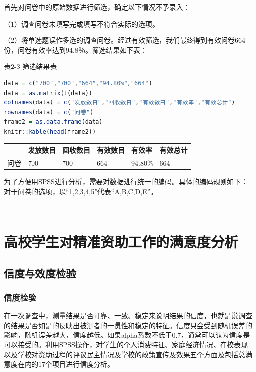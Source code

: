 \documentclass[UTF8,a4paper,12pt]{ctexart}  %
\begin{document}
首先对问卷中的原始数据进行筛选，确定以下情况不予录入：

（1）调查问卷未填写完或填写不符合实际的选项。

（2）将单选题误作多选的调查问卷。经过有效筛选，我们最终得到有效问卷664份，问卷有效率达到94.8％。筛选结果如下表：

表2-3 筛选结果表

\begin{lstlisting}[language=R]
data = c("700","700","664","94.80%","664")
data = as.matrix(t(data))
colnames(data) = c("发放数目","回收数目","有效数目","有效率","有效总计")
rownames(data) = c("问卷")
frame2 = as.data.frame(data)
knitr::kable(head(frame2))
\end{lstlisting}

\begin{tabular}{l|l|l|l|l|l}
\hline
  & 发放数目 & 回收数目 & 有效数目 & 有效率 & 有效总计\\
\hline
问卷 & 700 & 700 & 664 & 94.80\% & 664\\
\hline
\end{tabular}

为了方便用SPSS进行分析，需要对数据进行统一的编码。具体的编码规则如下：对于问卷的选项，以``1,2,3,4,5''代表``A,B,C,D,E''。

 

\hypertarget{section-19}{%
\section{高校学生对精准资助工作的满意度分析}\label{section-19}}

\hypertarget{section-20}{%
\subsection{信度与效度检验}\label{section-20}}

\hypertarget{section-21}{%
\subsubsection{信度检验}\label{section-21}}

在一次调查中，测量结果是否可靠、一致、稳定来说明结果的信度，也就是说调查的结果是否如是的反映出被测者的一贯性和稳定的特征。信度只会受到随机误差的影响，随机误差越大，信度越低。如果alpha系数不低于0.7，通常可以认为信度是可以接受的。利用SPSS操作，对学生的个人消费特征、家庭经济情况、在校表现以及学校对资助过程的评议民主情况及学校的政策宣传及效果五个方面及包括总满意度在内的17个项目进行信度分析。
\end{document}
